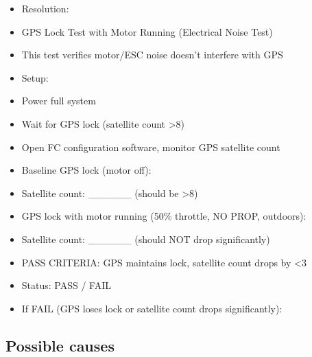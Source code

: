 \documentclass[11pt,letterpaper]{article}
\begin{document}
\begin{itemize}
  \item Resolution: \underline{\hspace{8.85cm}}
\end{itemize}

\begin{itemize}
  \item GPS Lock Test with Motor Running (Electrical Noise Test)
  \item [WARNING] This test verifies motor/ESC noise doesn't interfere with GPS
\end{itemize}

\begin{itemize}
  \item Setup:
  \item Power full system
  \item Wait for GPS lock (satellite count >8)
  \item Open FC configuration software, monitor GPS satellite count
\end{itemize}

\begin{itemize}
  \item Baseline GPS lock (motor off):
  \item Satellite count: \_\_\_\_\_\_    (should be >8)
\end{itemize}

\begin{itemize}
  \item GPS lock with motor running (50\% throttle, NO PROP, outdoors):
  \item Satellite count: \_\_\_\_\_\_    (should NOT drop significantly)
\end{itemize}

\begin{itemize}
  \item PASS CRITERIA: GPS maintains lock, satellite count drops by <3
  \item Status: PASS / FAIL
\end{itemize}

\begin{itemize}
  \item If FAIL (GPS loses lock or satellite count drops significantly):
\end{itemize}

\subsection{Possible causes}
\end{document}
